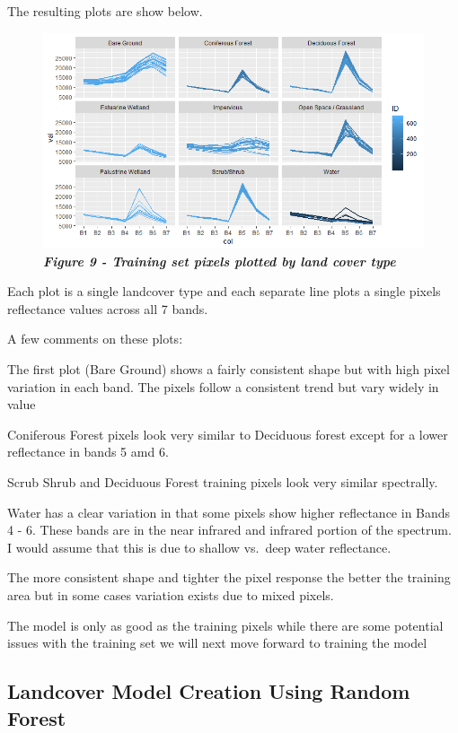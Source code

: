 \documentclass[]{article}
\begin{document}
The resulting plots are show below.

\begin{figure}
\centering
\includegraphics{images/TrainingSetPlot.png}
\caption{\textbf{\emph{Figure 9 - Training set pixels plotted by land
cover type}}}
\end{figure}

Each plot is a single landcover type and each separate line plots a
single pixels reflectance values across all 7 bands.

A few comments on these plots:

The first plot (Bare Ground) shows a fairly consistent shape but with
high pixel variation in each band. The pixels follow a consistent trend
but vary widely in value

Coniferous Forest pixels look very similar to Deciduous forest except
for a lower reflectance in bands 5 amd 6.

Scrub Shrub and Deciduous Forest training pixels look very similar
spectrally.

Water has a clear variation in that some pixels show higher reflectance
in Bands 4 - 6. These bands are in the near infrared and infrared
portion of the spectrum. I would assume that this is due to shallow
vs.~deep water reflectance.

The more consistent shape and tighter the pixel response the better the
training area but in some cases variation exists due to mixed pixels.

The model is only as good as the training pixels while there are some
potential issues with the training set we will next move forward to
training the model

\subsection{Landcover Model Creation Using Random
Forest}\label{landcover-model-creation-using-random-forest}
\end{document}
